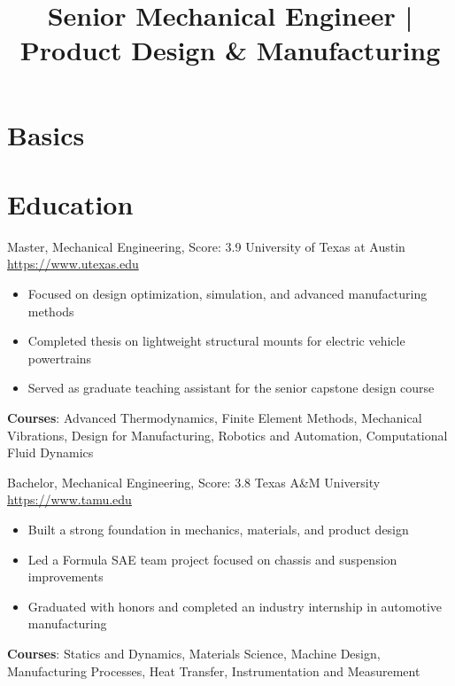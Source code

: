 \documentclass[a4paper, serif, 10pt]{moderncv}
\title{Senior Mechanical Engineer | Product Design \& Manufacturing}
\begin{document}
\maketitle

\section{Basics}

\section{Education}

        {Master, Mechanical Engineering, Score: 3.9}
        {University of Texas at Austin}
        {\url{https://www.utexas.edu}}
        {}
        {\begin{itemize}
\item Focused on design optimization, simulation, and advanced manufacturing methods
\item Completed thesis on lightweight structural mounts for electric vehicle powertrains
\item Served as graduate teaching assistant for the senior capstone design course
\end{itemize}
\textbf{Courses}: Advanced Thermodynamics, Finite Element Methods, Mechanical Vibrations, Design for Manufacturing, Robotics and Automation, Computational Fluid Dynamics}

        {Bachelor, Mechanical Engineering, Score: 3.8}
        {Texas A\&M University}
        {\url{https://www.tamu.edu}}
        {}
        {\begin{itemize}
\item Built a strong foundation in mechanics, materials, and product design
\item Led a Formula SAE team project focused on chassis and suspension improvements
\item Graduated with honors and completed an industry internship in automotive manufacturing
\end{itemize}
\textbf{Courses}: Statics and Dynamics, Materials Science, Machine Design, Manufacturing Processes, Heat Transfer, Instrumentation and Measurement}
\end{document}
